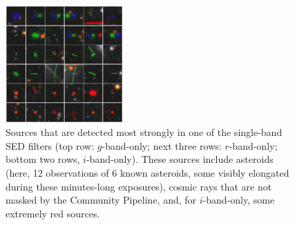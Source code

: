 \documentclass[11pt,letterpaper,linenumbers]{aastex63}
\begin{document}
\begin{figure}
  \begin{center}
    \includegraphics[width=0.4\textwidth]{singleband}
    \caption{Sources that are detected most strongly in one of the
      single-band SED filters (top row: $g$-band-only; next three
      rows: $r$-band-only; bottom two rows, $i$-band-only).  These
      sources include asteroids (here, 12 observations of 6 known
      asteroids, some visibly elongated during these minutes-long
      exposures), cosmic rays that are not masked by the Community
      Pipeline, and, for $i$-band-only, some extremely red sources.
      \label{fig:oneband}}
  \end{center}
\end{figure}
\end{document}
